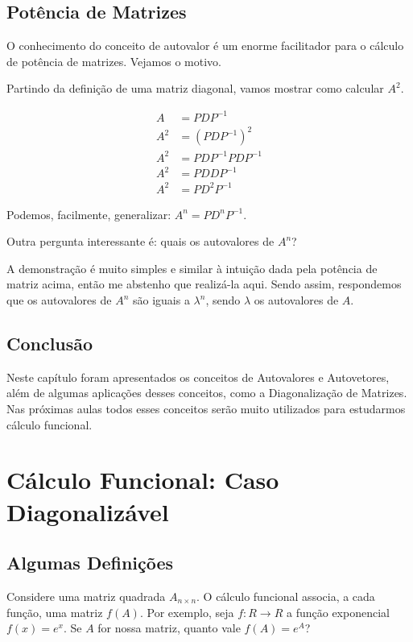 \documentclass[12pt]{article}
\begin{document}
\subsection{Potência de Matrizes}

O conhecimento do conceito de autovalor é um enorme facilitador para o cálculo de potência de matrizes. Vejamos o motivo.

Partindo da definição de uma matriz diagonal, vamos mostrar como calcular $A^2$.

\begin{align*}
	A&=PDP^{-1}\\
	A^2&=(PDP^{-1})^2\\
	A^2&=PDP^{-1}PDP^{-1}\\
	A^2&=PDDP^{-1}\\
	A^2&=PD^2P^{-1}
\end{align*}

Podemos, facilmente, generalizar: $A^n=PD^nP^{-1}$.

Outra pergunta interessante é: quais os autovalores de $A^n$?

A demonstração é muito simples e similar à intuição dada pela potência de matriz acima, então me abstenho que realizá-la aqui. Sendo assim, respondemos que os autovalores de $A^n$ são iguais a $\lambda^n$, sendo $\lambda$ os autovalores de $A$. 

\subsection{Conclusão}
Neste capítulo foram apresentados os conceitos de  Autovalores e Autovetores, além de algumas aplicações desses conceitos, como a Diagonalização de Matrizes. Nas próximas aulas todos esses conceitos serão muito utilizados para estudarmos cálculo funcional. 

\section{Cálculo Funcional: Caso Diagonalizável}

\subsection{Algumas Definições}

Considere uma matriz quadrada $A_{n\times n}$. O cálculo funcional associa, a cada função, uma matriz $f(A)$. Por exemplo, seja $f: R\rightarrow R$ a função exponencial $f(x)=e^x$. Se $A$ for nossa matriz, quanto vale $f(A)=e^A$?
\end{document}
